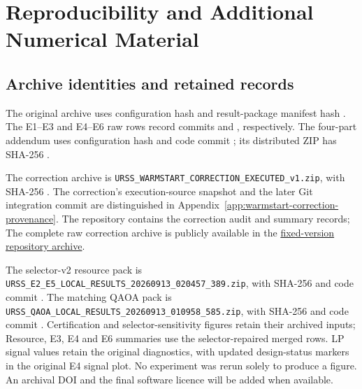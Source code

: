 \documentclass[a4paper,onecolumn,11pt,unpublished]{quantumarticle}
\theoremstyle{remark}
\begin{document}
\section{Reproducibility and Additional Numerical Material}
\label{app:reproducibility}

\subsection{Archive identities and retained records}
The original archive uses configuration hash
\texttt{}
and result-package manifest hash
\texttt{}.
The E1--E3 and E4--E6 raw rows record commits
\texttt{} and
\texttt{}, respectively.  The
four-part addendum uses configuration hash
\texttt{}
and code commit
\texttt{}; its distributed ZIP has
SHA-256
\texttt{}.

The correction archive is
\texttt{URSS\_WARMSTART\_CORRECTION\_EXECUTED\_v1.zip}, with SHA-256
\texttt{}.
The correction's execution-source snapshot and the later Git integration
commit are distinguished in Appendix~\ref{app:warmstart-correction-provenance}.
The repository contains the correction audit and summary records; The complete raw correction archive is publicly available in the
\href{https://github.com/rrocy6/urss-selective-locality-reduction/blob/efaa1ce60fbc9984006472c4b2672578027fac78/delivery/20260913/archives/URSS_WARMSTART_CORRECTION_EXECUTED_v1.zip}{fixed-version repository archive}.

The selector-v2 resource pack is
\nolinkurl{URSS_E2_E5_LOCAL_RESULTS_20260913_020457_389.zip}, with SHA-256
\texttt{}
and code commit
\texttt{}.
The matching QAOA pack is
\nolinkurl{URSS_QAOA_LOCAL_RESULTS_20260913_010958_585.zip}, with SHA-256
\texttt{}
and code commit
\texttt{}.
Certification and selector-sensitivity figures retain their archived inputs;
Resource, E3, E4 and E6 summaries use the selector-repaired merged rows.
LP signal values retain the original diagnostics, with updated design-status
markers in the original E4 signal plot. No experiment was
rerun solely to produce a figure. An archival DOI and
the final software licence will be added when available.
\end{document}
